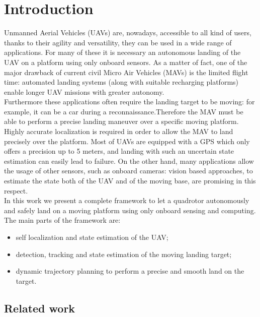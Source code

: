 \chapter{Introduction}\label{chap:introduction}
Unmanned Aerial Vehicles (UAVs) are, nowadays, accessible to all kind of users, thanks to their agility and versatility, they can be used in a wide range of applications. For many of these it is necessary an autonomous landing of the UAV on a platform using only onboard sensors. As a matter of fact, one of the major drawback of current civil Micro Air Vehicles (MAVs) is the limited flight time: automated landing systems (along with suitable recharging platforms) enable longer UAV missions with greater autonomy.\\
Furthermore these applications often require the landing target to be moving: for example, it can be a car during a reconnaissance.Therefore the MAV must be able to perform a precise landing maneuver over a specific moving platform.\\

Highly accurate localization is required in order to allow the MAV to land precisely over the platform. Most of UAVs are equipped with a GPS which only offers a precision up to 5 meters, and landing with such an uncertain state estimation can easily lead to failure. On the other hand, many applications allow the usage of other sensors, such as onboard cameras: vision based approaches, to estimate the state both of the UAV and of the moving base, are promising in this respect.\\

In this work we present a complete framework to let a quadrotor autonomously and safely land on a moving platform using only onboard sensing and computing.\\
The main parts of the framework are:
\begin{itemize}
\item self localization and state estimation of the UAV;
\item detection, tracking and state estimation of the moving landing target;
\item dynamic trajectory planning to perform a precise and smooth land on the target.
\end{itemize}

\section{Related work}\label{sec:related_work}

